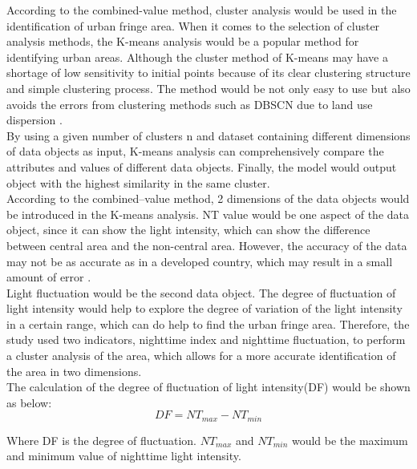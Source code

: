 According to the combined-value method, cluster analysis would be used in the identification of urban fringe area. When it comes to the selection of cluster analysis methods, the K-means analysis would be a popular method for identifying urban areas. Although the cluster method of K-means may have a shortage of low sensitivity to initial points because of its clear clustering structure and simple clustering process. The method would be not only easy to use but also avoids the errors from clustering methods such as DBSCN due to land use dispersion \parencite{feng_using_2020}.\\

By using a given number of clusters n and dataset containing different dimensions of data objects as input, K-means analysis can comprehensively compare the attributes and values of different data objects. Finally, the model would output object with the highest similarity in the same cluster.\\

According to the combined–value method, 2 dimensions of the data objects would be introduced in the K-means analysis. NT value would be one aspect of the data object, since it can show the light intensity, which can show the difference between central area and the non-central area. However, the accuracy of the data may not be as accurate as in a developed country, which may result in a small amount of error \parencite{zhang_can_2013}.\\

Light fluctuation would be the second data object. The degree of fluctuation of light intensity would help to explore the degree of variation of the light intensity in a certain range, which can do help to find the urban fringe area. Therefore, the study used two indicators, nighttime index and nighttime fluctuation, to perform a cluster analysis of the area, which allows for a more accurate identification of the area in two dimensions.\\

The calculation of the degree of fluctuation of light intensity(DF) would be shown as below:\\

\begin{equation}
DF=NT_{max}-NT_{min}
\end{equation}

Where DF is the degree of fluctuation. $NT_{max}$ and $NT_{min}$ would be the maximum and minimum value of nighttime light intensity.\\

